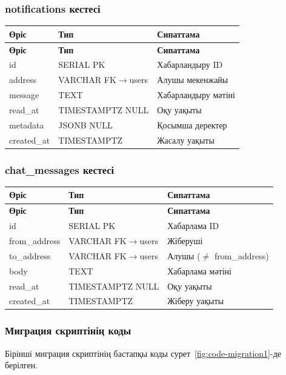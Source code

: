 \documentclass[14pt,a4paper]{extarticle}
\begin{document}
\subsubsection{notifications кестесі}
\begin{longtable}{|p{3.2cm}|p{3.7cm}|p{7.5cm}|}
\hline\textbf{Өріс} & \textbf{Тип} & \textbf{Сипаттама}\\\hline\endfirsthead\hline\textbf{Өріс} & \textbf{Тип} & \textbf{Сипаттама}\\\hline\endhead
id & SERIAL PK & Хабарландыру ID\\\hline
address & VARCHAR FK$\to$users & Алушы мекенжайы\\\hline
message & TEXT & Хабарландыру мәтіні\\\hline
read\_at & TIMESTAMPTZ NULL & Оқу уақыты\\\hline
metadata & JSONB NULL & Қосымша деректер\\\hline
created\_at & TIMESTAMPTZ & Жасалу уақыты\\\hline
\end{longtable}

\subsubsection{chat\_messages кестесі}
\begin{longtable}{|p{3.2cm}|p{3.7cm}|p{7.5cm}|}
\hline\textbf{Өріс} & \textbf{Тип} & \textbf{Сипаттама}\\\hline\endfirsthead\hline\textbf{Өріс} & \textbf{Тип} & \textbf{Сипаттама}\\\hline\endhead
id & SERIAL PK & Хабарлама ID\\\hline
from\_address & VARCHAR FK$\to$users & Жіберуші\\\hline
to\_address & VARCHAR FK$\to$users & Алушы ($\neq$ from\_address)\\\hline
body & TEXT & Хабарлама мәтіні\\\hline
read\_at & TIMESTAMPTZ NULL & Оқу уақыты\\\hline
created\_at & TIMESTAMPTZ & Жіберу уақыты\\\hline
\end{longtable}

\subsubsection{Миграция скриптінің коды}

Бірінші миграция скриптінің бастапқы коды сурет~\ref{fig:code-migration1}-де берілген.
\end{document}
